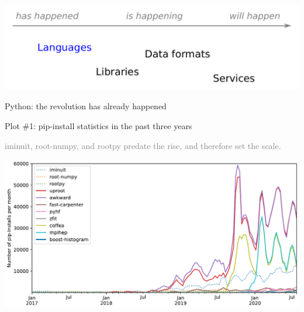 \documentclass[aspectratio=169]{beamer}
\begin{document}
\begin{frame}{\mbox{ }}
\vspace{0.5 cm}

\begin{center}
\includegraphics[width=0.9\linewidth]{img/topics-1.pdf}
\end{center}
\end{frame}

\begin{frame}{Python: the revolution has already happened}
\large
\vspace{0.5 cm}

Plot \#1: pip-install statistics in the past three years

\normalsize
\textcolor{gray}{iminuit, root-numpy, and rootpy predate the rise, and therefore set the scale.}

\begin{center}
\includegraphics[width=0.85\linewidth]{img/piplinear-iminuit-rootnumpy-rootpy-uproot-awkward-fastcarpenter-pyhf-zfit-coffea-mplhep-boosthistogram.pdf}
\end{center}
\end{frame}
\end{document}
